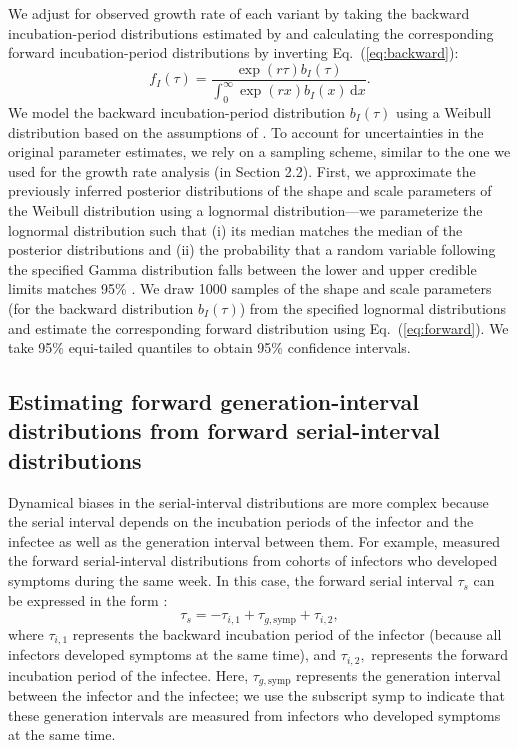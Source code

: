 \documentclass[12pt]{article}
\newcommand{\eref}[1]{Eq.~(\ref{eq:#1})}
\newcommand{\dd}[1]{\ensuremath{\, \mathrm{d}#1}}
\newcommand{\dx}{\dd{x}}
\begin{document}
We adjust for observed growth rate of each variant by taking the backward incubation-period distributions estimated by \cite{backer2021omicron} and calculating the corresponding forward incubation-period distributions by inverting \eref{backward}:
\begin{equation}
f_I(\tau) = \frac{\exp(r\tau) b_I(\tau) }{\int_0^\infty \exp(rx) b_I(x)\dx}.
\label{eq:forward}
\end{equation}
We model the backward incubation-period distribution $b_I(\tau)$ using a Weibull distribution based on the assumptions of \cite{backer2021omicron}.
To account for uncertainties in the original parameter estimates, we rely on a sampling scheme, similar to the one we used for the growth rate analysis (in Section 2.2).
First, we approximate the previously inferred posterior distributions of the shape and scale parameters of the Weibull distribution using a lognormal distribution---we parameterize the lognormal distribution such that (i) its median matches the median of the posterior distributions and (ii) the probability that a random variable following the specified Gamma distribution falls between the lower and upper credible limits matches 95\% \citep{park2020reconciling}.
We draw 1000 samples of the shape and scale parameters (for the backward distribution $b_I(\tau)$) from the specified lognormal distributions and estimate the corresponding forward distribution using \eref{forward}.
We take 95\% equi-tailed quantiles to obtain 95\% confidence intervals.

\subsection{Estimating forward generation-interval distributions from forward serial-interval distributions}

Dynamical biases in the serial-interval distributions are more complex because the serial interval depends on the incubation periods of the infector and the infectee as well as the generation interval between them.
For example, \cite{backer2021omicron} measured the forward serial-interval distributions from cohorts of infectors who developed symptoms during the same week.
In this case, the forward serial interval $\tau_s$ can be expressed in the form \citep{park2021forward}:
\begin{equation}
\tau_s =  - \tau_{i, 1} + \tau_{g, \mathrm{symp}} + \tau_{i, 2},
\label{eq:serial}
\end{equation}
where $\tau_{i, 1}$ represents the backward incubation period of the infector (because all infectors developed symptoms at the same time), and $\tau_{i, 2},$ represents the forward incubation period of the infectee.
Here, $\tau_{g, \mathrm{symp}}$ represents the generation interval between the infector and the infectee; we use the subscript $\mathrm{symp}$ to indicate that these generation intervals are measured from infectors who developed symptoms at the same time.
\end{document}
